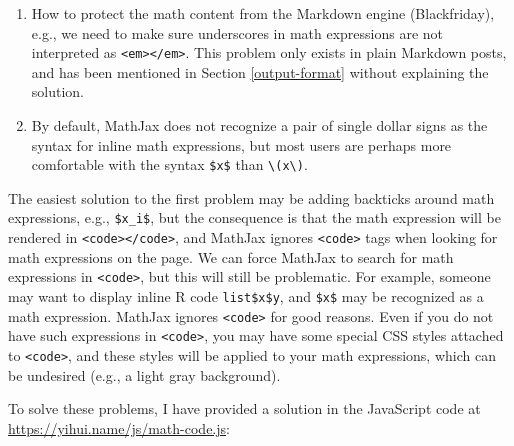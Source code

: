 \documentclass[12pt,]{krantz}
\theoremstyle{definition}
\theoremstyle{definition}
\theoremstyle{definition}
\theoremstyle{remark}
\begin{document}
\begin{enumerate}
\def\labelenumi{\arabic{enumi}.}
\item
  How to protect the math content from the Markdown engine
  (Blackfriday), e.g., we need to make sure underscores in math
  expressions are not interpreted as
  \texttt{\textless{}em\textgreater{}\textless{}/em\textgreater{}}. This
  problem only exists in plain Markdown posts, and has been mentioned in
  Section \ref{output-format} without explaining the solution.
\item
  By default, MathJax does not recognize a pair of single dollar signs
  as the syntax for inline math expressions, but most users are perhaps
  more comfortable with the syntax \texttt{\$x\$} than
  \texttt{\textbackslash{}(x\textbackslash{})}.
\end{enumerate}

The easiest solution to the first problem may be adding backticks around
math expressions, e.g.,
\texttt{\textasciigrave{}\$x\_i\$\textasciigrave{}}, but the consequence
is that the math expression will be rendered in
\texttt{\textless{}code\textgreater{}\textless{}/code\textgreater{}},
and MathJax ignores \texttt{\textless{}code\textgreater{}} tags when
looking for math expressions on the page. We can force MathJax to search
for math expressions in \texttt{\textless{}code\textgreater{}}, but this
will still be problematic. For example, someone may want to display
inline R code \texttt{\textasciigrave{}list\$x\$y\textasciigrave{}}, and
\texttt{\$x\$} may be recognized as a math expression. MathJax ignores
\texttt{\textless{}code\textgreater{}} for good reasons. Even if you do
not have such expressions in \texttt{\textless{}code\textgreater{}}, you
may have some special CSS styles attached to
\texttt{\textless{}code\textgreater{}}, and these styles will be applied
to your math expressions, which can be undesired (e.g., a light gray
background).

To solve these problems, I have provided a solution in the JavaScript
code at \url{https://yihui.name/js/math-code.js}:
\end{document}
